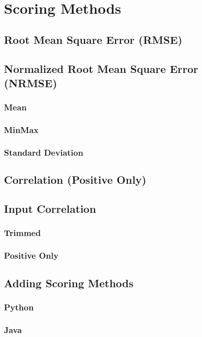 
\chapter{Scoring Methods} \label{chap:ScoringMethods}

\section{Root Mean Square Error (RMSE)}
\section{Normalized Root Mean Square Error (NRMSE)}
\subsection{Mean}
\subsection{MinMax}
\subsection{Standard Deviation}
\section{Correlation (Positive Only)}
\section{Input Correlation}
\subsection{Trimmed}
\subsection{Positive Only}
\section{Adding Scoring Methods}
\subsection{Python}
\subsection{Java}

